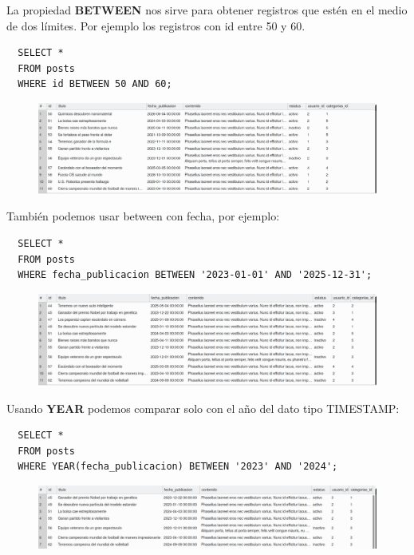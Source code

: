 \documentclass{article}
\begin{document}
La propiedad \textbf{BETWEEN} nos sirve para obtener registros que estén en el
medio de dos límites. Por ejemplo los registros con id entre 50 y 60.

\begin{verbatim}
  SELECT *
  FROM posts
  WHERE id BETWEEN 50 AND 60;
\end{verbatim}

\newpage

\begin{figure}[h!]
  \centering
  \includegraphics[scale=0.5]{./Pictures/114_where_id_between.png}
\end{figure}

También podemos usar between con fecha, por ejemplo:\\

\begin{verbatim}
  SELECT *
  FROM posts
  WHERE fecha_publicacion BETWEEN '2023-01-01' AND '2025-12-31';
\end{verbatim}

\begin{figure}[h!]
  \centering
  \includegraphics[scale=0.5]{./Pictures/113_where_fecha_between.png}
\end{figure}

Usando \textbf{YEAR} podemos comparar solo con el año del dato tipo TIMESTAMP:\\

\begin{verbatim}
  SELECT *
  FROM posts
  WHERE YEAR(fecha_publicacion) BETWEEN '2023' AND '2024';
\end{verbatim}

\begin{figure}[h!]
  \centering
  \includegraphics[scale=0.5]{./Pictures/115_where_date_year.png}
\end{figure}
\end{document}
